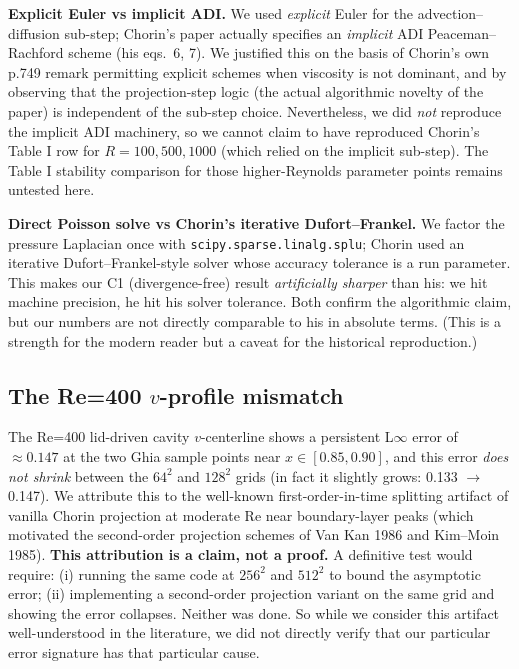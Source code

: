 \documentclass[11pt]{article}
\begin{document}
\textbf{Explicit Euler vs implicit ADI.} We used \emph{explicit} Euler for the advection--diffusion sub-step; Chorin's paper actually specifies an \emph{implicit} ADI Peaceman--Rachford scheme (his eqs.\ 6, 7). We justified this on the basis of Chorin's own p.749 remark permitting explicit schemes when viscosity is not dominant, and by observing that the projection-step logic (the actual algorithmic novelty of the paper) is independent of the sub-step choice. Nevertheless, we did \emph{not} reproduce the implicit ADI machinery, so we cannot claim to have reproduced Chorin's Table I row for $R = 100, 500, 1000$ (which relied on the implicit sub-step). The Table I stability comparison for those higher-Reynolds parameter points remains untested here.

\textbf{Direct Poisson solve vs Chorin's iterative Dufort--Frankel.} We factor the pressure Laplacian once with \texttt{scipy.sparse.linalg.splu}; Chorin used an iterative Dufort--Frankel-style solver whose accuracy tolerance is a run parameter. This makes our C1 (divergence-free) result \emph{artificially sharper} than his: we hit machine precision, he hit his solver tolerance. Both confirm the algorithmic claim, but our numbers are not directly comparable to his in absolute terms. (This is a strength for the modern reader but a caveat for the historical reproduction.)

\subsection{The Re=400 $v$-profile mismatch}

The Re=400 lid-driven cavity $v$-centerline shows a persistent L$\infty$ error of $\approx 0.147$ at the two Ghia sample points near $x \in [0.85, 0.90]$, and this error \emph{does not shrink} between the $64^2$ and $128^2$ grids (in fact it slightly grows: 0.133 $\to$ 0.147). We attribute this to the well-known first-order-in-time splitting artifact of vanilla Chorin projection at moderate Re near boundary-layer peaks (which motivated the second-order projection schemes of Van Kan 1986 and Kim--Moin 1985). \textbf{This attribution is a claim, not a proof.} A definitive test would require: (i) running the same code at $256^2$ and $512^2$ to bound the asymptotic error; (ii) implementing a second-order projection variant on the same grid and showing the error collapses. Neither was done. So while we consider this artifact well-understood in the literature, we did not directly verify that our particular error signature has that particular cause.
\end{document}
